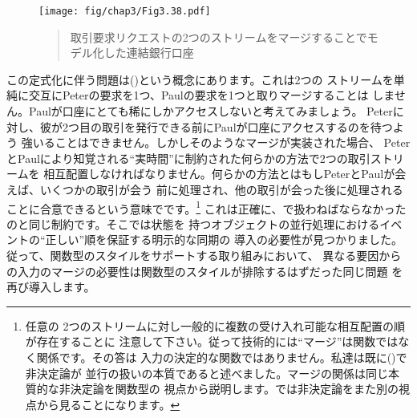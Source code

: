 \begin{figure}[tb]
\label{Figure 3.38}
\centering
\begin{comment}
\heading{Figure 3.38:} A joint bank account, modeled by merging two streams of transaction requests.

\begin{example}
Peter's requests   +---------+     +---------+
------------------>|         |     |         |
Paul's requests    |  merge  |---->| bank    |---->
------------------>|         |     | account |
                   +---------+     +---------+
\end{example}
\end{comment}
\texttt{[image: fig/chap3/Fig3.38.pdf]}
\begin{quote}
 取引要求リクエストの2つのストリームをマージすることでモデル化した連結銀行口座
\end{quote}
\end{figure}

\noindent
この定式化に伴う問題は()という概念にあります。これは2つの
ストリームを単純に交互にPeterの要求を1つ、Paulの要求を1つと取りマージすることは
しません。Paulが口座にとても稀にしかアクセスしないと考えてみましょう。
Peterに対し、彼が2つ目の取引を発行できる前にPaulが口座にアクセスするのを待つよう
強いることはできません。しかしそのようなマージが実装された場合、
PeterとPaulにより知覚される``実時間''に制約された何らかの方法で2つの取引ストリームを
相互配置しなければなりません。何らかの方法とはもしPeterとPaulが会えば、いくつかの取引が会う
前に処理され、他の取引が会った後に処理されることに合意できるという意味でです。\footnote{任意の
2つのストリームに対し一般的に複数の受け入れ可能な相互配置の順が存在することに
注意して下さい。従って技術的には``マージ''は関数ではなく関係です。その答は
入力の決定的な関数ではありません。私達は既に()で非決定論が
並行の扱いの本質であると述べました。マージの関係は同じ本質的な非決定論を関数型の
視点から説明します。では非決定論をまた別の視点から見ることになります。}
これは正確に、で扱わねばならなかったのと同じ制約です。そこでは状態を
持つオブジェクトの並行処理におけるイベントの``正しい''順を保証する明示的な同期の
導入の必要性が見つかりました。従って、関数型のスタイルをサポートする取り組みにおいて、
異なる要因からの入力のマージの必要性は関数型のスタイルが排除するはずだった同じ問題
を再び導入します。


